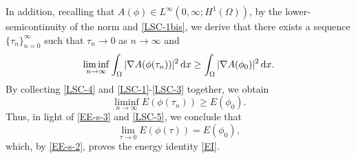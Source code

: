 \documentclass[11pt,reqno]{amsart}
\theoremstyle{remark}
\def\d{{\rm d}}
\numberwithin{equation}{section}
\def\d{{\rm d}}
\begin{document}
In addition, recalling that $A(\phi) \in L^\infty(0,\infty; H^1(\Omega))$, by the lower-semicontinuity of the norm and \eqref{LSC-1bis},
we derive that there exists a sequence $\lbrace \tau_n \rbrace_{n=0}^\infty$ such that $\tau_n \to 0$ as $n \to \infty$ and
\begin{equation}
\label{LSC-3}
\liminf_{n \to \infty} \int_\Omega |\nabla A(\phi(\tau_n))|^2 \, \d x
\geq \int_\Omega |\nabla A(\phi_0)|^2 \, \d x.
\end{equation}
By collecting \eqref{LSC-4} and \eqref{LSC-1}-\eqref{LSC-3} together,
we obtain
\begin{equation}
\label{LSC-5}
\liminf_{n \to \infty}  E (\phi(\tau_n)) \geq E(\phi_0).
\end{equation}
Thus, in light of \eqref{EE-s-3} and \eqref{LSC-5}, we conclude that
\begin{equation}
\label{EE-0}
\lim_{\tau \to 0}  E (\phi(\tau)) = E(\phi_0),
\end{equation}
which, by \eqref{EE-s-2}, proves the energy identity \eqref{EI}.
\end{document}
